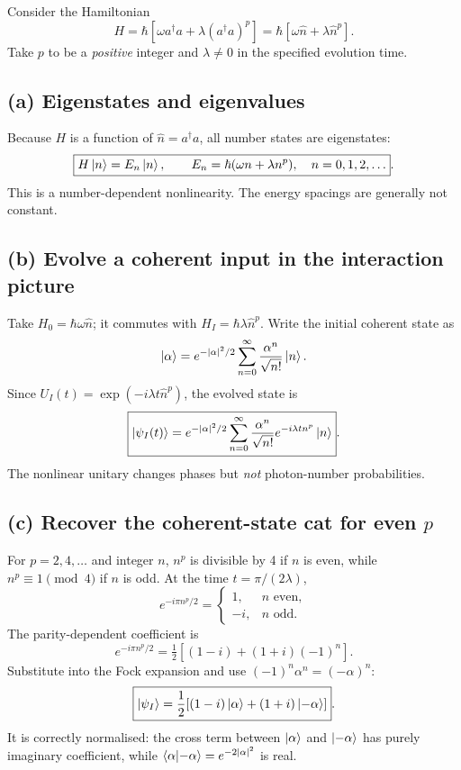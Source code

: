 
Consider the Hamiltonian
\[
H=\hbar[\omega a^\dagger a+\lambda(a^\dagger a)^p]
=\hbar[\omega\hat n+\lambda\hat n^p].
\]
Take \(p\) to be a \emph{positive} integer and
\(\lambda\ne0\) in the specified evolution time.

\subsection*{(a) Eigenstates and eigenvalues}
Because \(H\) is a function of \(\hat n=a^\dagger a\),
all number states are eigenstates:
\[
\boxed{H\left\lvert n\right\rangle=E_n\left\lvert n\right\rangle,\qquad
E_n=\hbar(\omega n+\lambda n^p),\quad n=0,1,2,\ldots}.
\]
This is a number-dependent nonlinearity. The
energy spacings are generally not constant.

\subsection*{(b) Evolve a coherent input in the interaction picture}
Take \(H_0=\hbar\omega\hat n\); it commutes with
\(H_I=\hbar\lambda\hat n^p\).
Write the initial coherent state as
\[
\left\lvert \alpha\right\rangle=e^{-|\alpha|^2/2}
\sum_{n=0}^\infty\frac{\alpha^n}{\sqrt{n!}}\left\lvert n\right\rangle .
\]
Since
\(U_I(t)=\exp(-i\lambda t\hat n^p)\),
the evolved state is
\[
\boxed{\left\lvert \psi_I(t)\right\rangle=
e^{-|\alpha|^2/2}
\sum_{n=0}^\infty
\frac{\alpha^n}{\sqrt{n!}}
e^{-i\lambda t n^p}\left\lvert n\right\rangle}.
\]
The nonlinear unitary changes phases but
\emph{not} photon-number probabilities.

\subsection*{(c) Recover the coherent-state cat for even \(p\)}
For \(p=2,4,\ldots\) and integer \(n\),
\(n^p\) is divisible by 4 if \(n\) is even,
while \(n^p\equiv1\pmod4\) if \(n\) is odd.
At the time \(t=\pi/(2\lambda)\),
\[
e^{-i\pi n^p/2}=
\begin{cases}1,&n\text{ even},\\-i,&n\text{ odd}.\end{cases}
\]
The parity-dependent coefficient is
\[
e^{-i\pi n^p/2}=
\tfrac12[(1-i)+(1+i)(-1)^n].
\]
Substitute into the Fock expansion and use
\((-1)^n\alpha^n=(-\alpha)^n\):
\[
\boxed{\left\lvert \psi_I\right\rangle=\frac12
[(1-i)\left\lvert \alpha\right\rangle+(1+i)\left\lvert -\alpha\right\rangle]}.
\]
It is correctly normalised: the cross term
between \(\left\lvert \alpha\right\rangle\) and \(\left\lvert -\alpha\right\rangle\)
has purely imaginary coefficient, while
\(\left\langle \alpha\middle\vert -\alpha\right\rangle=e^{-2|\alpha|^2}\)
is real.

